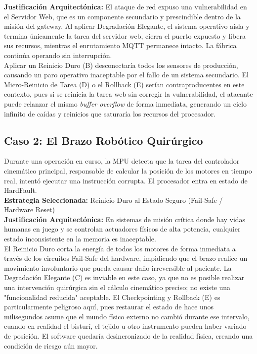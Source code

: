 \documentclass[12pt,letterpaper]{article}
\begin{document}
\textbf{Justificación Arquitectónica:} El ataque de red expuso una vulnerabilidad en el Servidor Web, que es un
componente secundario y prescindible dentro de la misión del gateway. Al aplicar Degradación Elegante, el sistema
operativo aísla y termina únicamente la tarea del servidor web, cierra el puerto expuesto y libera sus recursos,
mientras el enrutamiento MQTT permanece intacto. La fábrica continúa operando sin interrupción.\\

Aplicar un Reinicio Duro (B) desconectaría todos los sensores de producción, causando un paro operativo
inaceptable por el fallo de un sistema secundario. El Micro-Reinicio de Tarea (D) o el Rollback (E) serían
contraproducentes en este contexto, pues si se reinicia la tarea web sin corregir la vulnerabilidad, el atacante
puede relanzar el mismo \textit{buffer overflow} de forma inmediata, generando un ciclo infinito de caídas y
reinicios que saturaría los recursos del procesador.
 
\subsection*{Caso 2: El Brazo Robótico Quirúrgico}
Durante una operación en curso, la MPU detecta que la tarea del controlador cinemático principal, responsable de
calcular la posición de los motores en tiempo real, intentó ejecutar una instrucción corrupta. El procesador
entra en estado de HardFault.\\
 
\textbf{Estrategia Seleccionada:} Reinicio Duro al Estado Seguro (Fail-Safe / Hardware Reset)\\
 
\textbf{Justificación Arquitectónica:} En sistemas de misión crítica donde hay vidas humanas en juego y se
controlan actuadores físicos de alta potencia, cualquier estado inconsistente en la memoria es inaceptable.\\
El Reinicio Duro corta la energía de todos los motores de forma inmediata a través de los circuitos Fail-Safe del
hardware, impidiendo que el brazo realice un movimiento involuntario que pueda causar daño irreversible al
paciente. La Degradación Elegante (C) es inviable en este caso, ya que no es posible realizar una intervención
quirúrgica sin el cálculo cinemático preciso; no existe una "funcionalidad reducida" aceptable. El Checkpointing
y Rollback (E) es particularmente peligroso aquí, pues restaurar el estado de hace unos milisegundos asume que el
mundo físico externo no cambió durante ese intervalo, cuando en realidad el bisturí, el tejido u otro instrumento
pueden haber variado de posición. El software quedaría desincronizado de la realidad física, creando una
condición de riesgo aún mayor.
 
\end{document}

